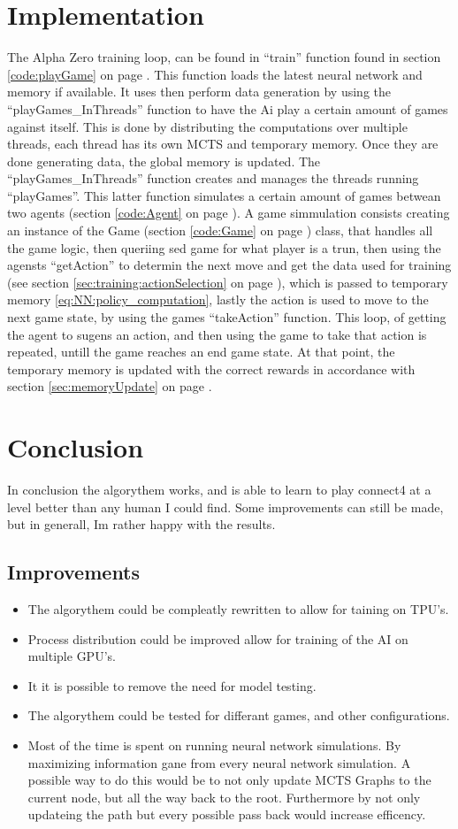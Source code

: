 \documentclass[12pt]{article}
\newcommand{\sectionref}[1]{section \ref{#1} on page \pageref{#1}}
\begin{document}
\section{Implementation}
The Alpha Zero training loop, can be found in ``train'' function found in \sectionref{code:playGame}. This function loads the latest neural network and memory if available. It uses then perform data generation by using the ``playGames\_InThreads'' function to have the Ai play a certain amount of games against itself. This is done by distributing the computations over multiple threads, each thread has its own MCTS and temporary memory. Once they are done generating data, the global memory is updated. The ``playGames\_InThreads'' function creates and manages the threads running ``playGames''. This latter function simulates a certain amount of games betwean two agents (\sectionref{code:Agent}). A game simmulation consists creating an instance of the Game (\sectionref{code:Game}) class, that handles all the game logic, then queriing sed game for what player is a trun, then using the agensts ``getAction'' to determin the next move and get the data used for training (see \sectionref{sec:training:actionSelection}), which is passed to temporary memory \eqref{eq:NN:policy_computation}, lastly the action is used to move to the next game state, by using the games ``takeAction'' function. This loop, of getting the agent to sugens an action, and then using the game to take that action is repeated, untill the game reaches an end game state. At that point, the temporary memory is updated with the correct rewards in accordance with \sectionref{sec:memoryUpdate}.


\section{Conclusion}
In conclusion the algorythem works, and is able to learn to play connect4 at a level better than any human I could find. Some improvements can still be made, but in generall, Im rather happy with the results.
\subsection{Improvements}
\begin{itemize}
\item The algorythem could be compleatly rewritten to allow for taining on TPU's.
\item Process distribution could be improved allow for training of the AI on multiple GPU's.
\item It it is possible to remove the need for model testing.
\item The algorythem could be tested for differant games, and other configurations.
\item Most of the time is spent on running neural network simulations. By maximizing information gane from every neural network simulation.  A possible way to do this would be to not only update MCTS Graphs to the current node, but all the way back to the root. Furthermore by not only updateing the path but every possible pass back would increase efficency. 
\end{itemize}
\end{document}
